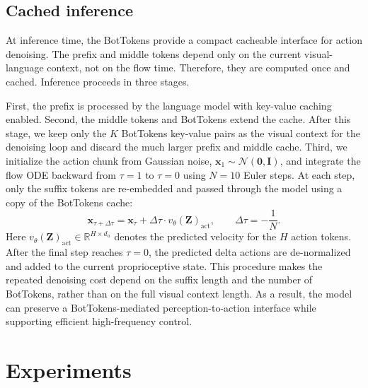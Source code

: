 \documentclass[a4paper,table]{extarticle}
\begin{document}
\subsection{Cached inference}
\label{sec:method:infer}

At inference time, the BotTokens provide a compact cacheable interface for action denoising. The prefix and middle tokens depend only on the current visual-language context, not on the flow time. Therefore, they are computed once and cached. Inference proceeds in three stages.

First, the prefix is processed by the language model with key-value caching enabled. Second, the middle tokens and BotTokens extend the cache. After this stage, we keep only the $K$ BotTokens key-value pairs as the visual context for the denoising loop and discard the much larger prefix and middle cache. Third, we initialize the action chunk from Gaussian noise, $\mathbf x_1\sim\mathcal N(\mathbf 0,\mathbf I)$, and integrate the flow ODE backward from $\tau=1$ to $\tau=0$ using $N=10$ Euler steps. At each step, only the suffix tokens are re-embedded and passed through the model using a copy of the BotTokens cache:
\begin{equation}
\mathbf x_{\tau+\Delta \tau}
=
\mathbf x_\tau
+
\Delta \tau \cdot v_\theta(\mathbf Z)_{\mathrm{act}},
\qquad
\Delta \tau=-\frac{1}{N}.
\end{equation}
Here $v_\theta(\mathbf Z)_{\mathrm{act}}\in\mathbb R^{H\times d_a}$ denotes the predicted velocity for the $H$ action tokens. After the final step reaches $\tau=0$, the predicted delta actions are de-normalized and added to the current proprioceptive state. This procedure makes the repeated denoising cost depend on the suffix length and the number of BotTokens, rather than on the full visual context length. As a result, the model can preserve a BotTokens-mediated perception-to-action interface while supporting efficient high-frequency control.

\section{Experiments}
\label{sec:experiments}
\end{document}
